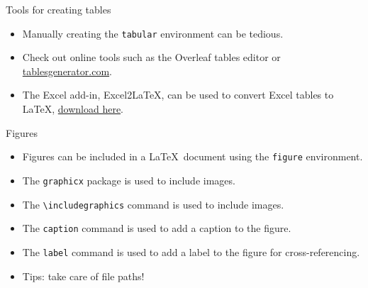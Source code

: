 \documentclass[t,12pt,xcolor=dvipsnames]{beamer}
\begin{document}
\begin{frame}{Tools for creating tables}
    \begin{itemize}
        \item Manually creating the \texttt{tabular} environment can be tedious.
        \item Check out online tools such as the Overleaf tables editor or \href{tablesgenerator.com}{tablesgenerator.com}.
        \item The Excel add-in, Excel2LaTeX, can be used to convert Excel tables to \LaTeX, \href{https://github.com/ivankokan/Excel2LaTeX/releases/tag/v3.5.0}{download here}.
    \end{itemize}
\end{frame}

\begin{frame}{Figures}
    \begin{itemize}
        \item Figures can be included in a \LaTeX \ document using the \texttt{figure} environment.
        \item The \texttt{graphicx} package is used to include images.
        \item The \texttt{\textbackslash includegraphics} command is used to include images.
        \item The \texttt{caption} command is used to add a caption to the figure.
        \item The \texttt{label} command is used to add a label to the figure for cross-referencing.
        \item Tips: take care of file paths!
    \end{itemize}
\end{frame}


\end{document}
